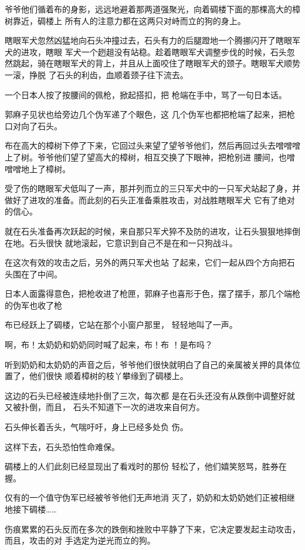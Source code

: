 \documentclass{article}
\begin{document}
爷爷他们循着布的身影，远远地避着那两道强聚光，向着碉楼下面的那棵高大的樟树靠近，碉楼上
所有人的注意力都在这两只对峙而立的狗的身上。 

瞎眼军犬忽然凶猛地向石头冲撞过去，石头有力的后腿蹬地一个腾挪闪开了瞎眼军犬的进攻，瞎眼
\newpage
军犬一个趔趄没有站稳。趁着瞎眼军犬调整步伐的时候，石头忽然跳起，骑在瞎眼军犬的背上，并且从上面咬住了瞎眼军犬的颈子。瞎眼军犬顺势一滚，挣脱
了石头的利齿，血顺着颈子往下流去。 

一个日本人按了按腰间的佩枪，掀起搭扣，把
枪端在手中，骂了一句日本话。 

郭麻子见状也给旁边几个伪军递了个眼色，这
几个伪军也都把枪端了起来，把枪口对向了石头。 

布在高大的樟树下停了下来，它回过头来望了望爷爷他们，然后再回过头去噌噌噌上了树。爷爷他们望了望高大的樟树，相互交换了下眼神，把枪别进
腰间，也噌噌噌地上了樟树。 

受了伤的瞎眼军犬低叫了一声，那并列而立的三只军犬中的一只军犬站起了身，并做好了进攻的准备。而此刻的石头正准备乘胜攻击，对战胜瞎眼军犬
它有了绝对的信心。 

\newpage

就在石头准备再次跃起的时候，来自那只军犬猝不及防的进攻，让石头狠狠地摔倒在地。石头很快
就地滚起，它意识到自己不是在和一只狗战斗。 

在这次有效的攻击之后，另外的两只军犬也站
了起来，它们一起从四个方向把石头围在了中间。 

日本人面露得意色，把枪收进了枪匣，郭麻子也喜形于色，摆了摆手，那几个端枪的伪军也收了枪

布已经跃上了碉楼，它站在那个小窗户那里，
轻轻地叫了一声。 

啊，布！太奶奶和奶奶同时喊了起来，布！布
！是布吗？ 

听到奶奶和太奶奶的声音之后，爷爷他们很快就明白了自己的亲属被关押的具体位置了，他们很快
顺着樟树的枝丫攀缘到了碉楼上。 

这边的石头已经被连续地扑倒了三次，每次都
\newpage
是在石头还没有从跌倒中调整好就又被扑倒，而且，
石头不知道下一次的进攻来自何方。 

石头伸长着舌头，气喘吁吁，身上已经多处负
伤。 


这样下去，石头恐怕性命难保。 

碉楼上的人们此刻已经显现出了看戏时的那份
轻松了，他们嬉笑怒骂，胜券在握。 

仅有的一个值守伪军已经被爷爷他们无声地消
灭了，奶奶和太奶奶她们正被相继地接下碉楼…… 

伤痕累累的石头反而在多次的跌倒和挫败中平静了下来，它决定要发起主动攻击，而且，攻击的对
手选定为逆光而立的狗。 
\end{document}
